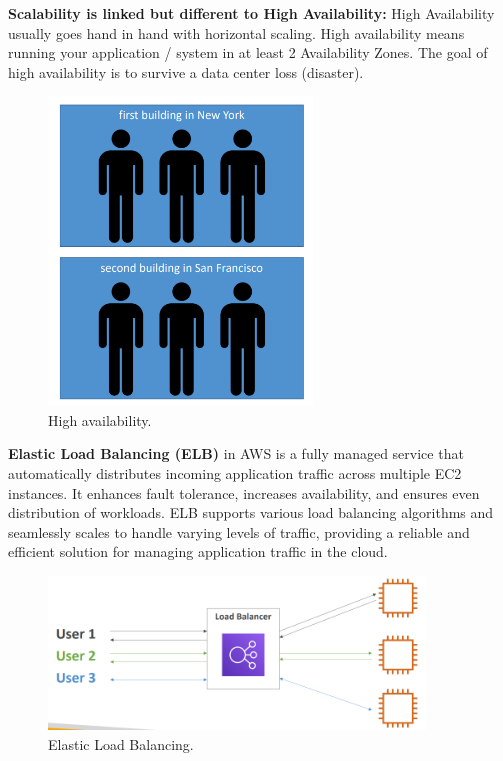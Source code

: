 \documentclass{article}
\begin{document}
\textbf{Scalability is linked but different to High Availability: } High Availability usually goes hand in hand with horizontal scaling. High availability means running your application / system in at  least 2 Availability Zones. The goal of high availability is to survive a data center loss (disaster).\par

\begin{figure}[h]
    \centering
    \includegraphics[width=7cm]{Pictures/Theory/High availability.png}
    \caption{High availability.}
    \label{fig:enter-label}
\end{figure}


\textbf{Elastic Load Balancing (ELB) }in AWS is a fully managed service that automatically distributes incoming application traffic across multiple EC2 instances. It enhances fault tolerance, increases availability, and ensures even distribution of workloads. ELB supports various load balancing algorithms and seamlessly scales to handle varying levels of traffic, providing a reliable and efficient solution for managing application traffic in the cloud.\par
\begin{figure}[h]
    \centering
    \includegraphics[width=10cm]{Pictures/Theory/ELB.png}
    \caption{Elastic Load Balancing.}
    \label{fig:enter-label}
\end{figure}
\end{document}
